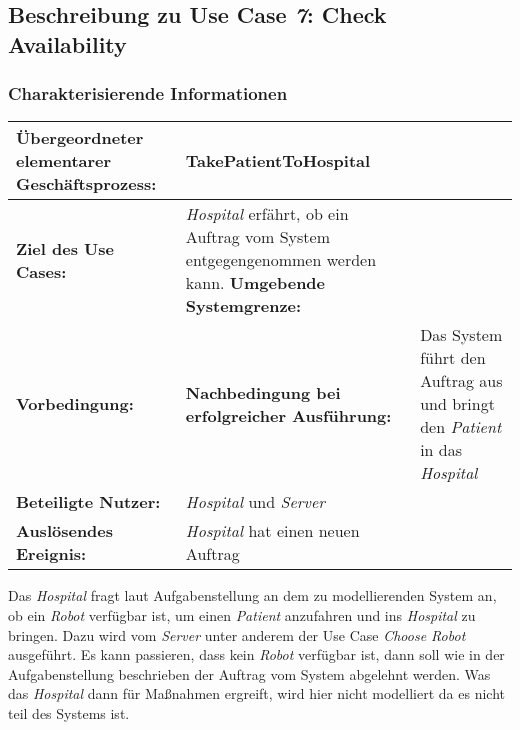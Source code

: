 
	\pagebreak


		\subsection{Beschreibung zu Use Case \emph{7}: Check Availability}

			\subsubsection*{Charakterisierende Informationen}

			\begin{table}[H]
				\centering
				\begin{tabularx}{\textwidth}{@{}p{5cm}X@{}}
				\hline
				\textbf{Übergeordneter elementarer Geschäftsprozess:} & TakePatientToHospital  \\ \hline
				\textbf{Ziel des Use Cases:} & \emph{Hospital} erfährt, ob ein Auftrag vom System entgegengenommen werden kann. \hline
				\textbf{Umgebende Systemgrenze:} &  \\ \hline
				\textbf{Vorbedingung:} &  \hline
				\textbf{Nachbedingung bei erfolgreicher Ausführung:} & Das System führt den Auftrag aus und bringt den \emph{Patient} in das \emph{Hospital} \\ \hline
				\textbf{Beteiligte Nutzer:} & \emph{Hospital} und \emph{Server}\\ \hline
				\textbf{Auslösendes Ereignis:} & \emph{Hospital} hat einen neuen Auftrag\\
				\hline
				\end{tabularx}
			\end{table}

			Das \emph{Hospital} fragt laut Aufgabenstellung an dem zu modellierenden System an, ob ein \emph{Robot} verfügbar ist, um einen \emph{Patient} anzufahren und ins \emph{Hospital} zu bringen. Dazu wird vom \emph{Server} unter anderem der Use Case \emph{Choose Robot} ausgeführt. Es kann passieren, dass kein \emph{Robot} verfügbar ist, dann soll wie in der Aufgabenstellung beschrieben der Auftrag vom System abgelehnt werden. Was das \emph{Hospital} dann für Maßnahmen ergreift, wird hier nicht modelliert da es nicht teil des Systems ist.


